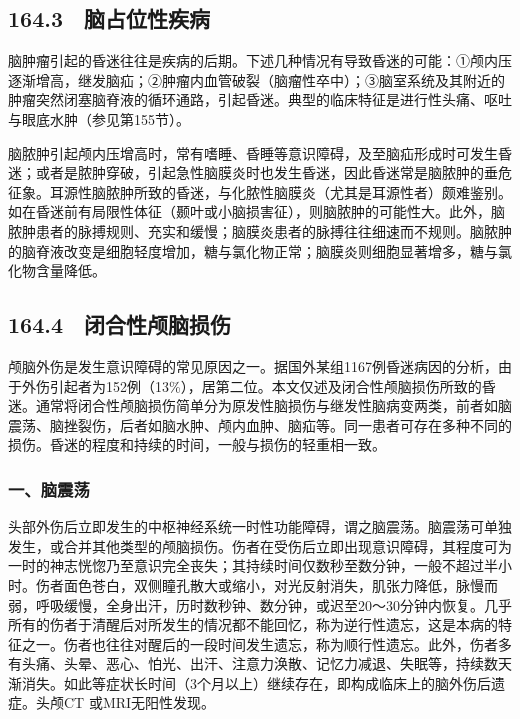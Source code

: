\subsection{164.3　脑占位性疾病}

脑肿瘤引起的昏迷往往是疾病的后期。下述几种情况有导致昏迷的可能：①颅内压逐渐增高，继发脑疝；②肿瘤内血管破裂（脑瘤性卒中）；③脑室系统及其附近的肿瘤突然闭塞脑脊液的循环通路，引起昏迷。典型的临床特征是进行性头痛、呕吐与眼底水肿（参见第155节）。

脑脓肿引起颅内压增高时，常有嗜睡、昏睡等意识障碍，及至脑疝形成时可发生昏迷；或者是脓肿穿破，引起急性脑膜炎时也发生昏迷，因此昏迷常是脑脓肿的垂危征象。耳源性脑脓肿所致的昏迷，与化脓性脑膜炎（尤其是耳源性者）颇难鉴别。如在昏迷前有局限性体征（颞叶或小脑损害征），则脑脓肿的可能性大。此外，脑脓肿患者的脉搏规则、充实和缓慢；脑膜炎患者的脉搏往往细速而不规则。脑脓肿的脑脊液改变是细胞轻度增加，糖与氯化物正常；脑膜炎则细胞显著增多，糖与氯化物含量降低。

\protect\hypertarget{text00378.html}{}{}

\subsection{164.4　闭合性颅脑损伤}

颅脑外伤是发生意识障碍的常见原因之一。据国外某组1167例昏迷病因的分析，由于外伤引起者为152例（13\%），居第二位。本文仅述及闭合性颅脑损伤所致的昏迷。通常将闭合性颅脑损伤简单分为原发性脑损伤与继发性脑病变两类，前者如脑震荡、脑挫裂伤，后者如脑水肿、颅内血肿、脑疝等。同一患者可存在多种不同的损伤。昏迷的程度和持续的时间，一般与损伤的轻重相一致。

\subsubsection{一、脑震荡}

头部外伤后立即发生的中枢神经系统一时性功能障碍，谓之脑震荡。脑震荡可单独发生，或合并其他类型的颅脑损伤。伤者在受伤后立即出现意识障碍，其程度可为一时的神志恍惚乃至意识完全丧失；其持续时间仅数秒至数分钟，一般不超过半小时。伤者面色苍白，双侧瞳孔散大或缩小，对光反射消失，肌张力降低，脉慢而弱，呼吸缓慢，全身出汗，历时数秒钟、数分钟，或迟至20～30分钟内恢复。几乎所有的伤者于清醒后对所发生的情况都不能回忆，称为逆行性遗忘，这是本病的特征之一。伤者也往往对醒后的一段时间发生遗忘，称为顺行性遗忘。此外，伤者多有头痛、头晕、恶心、怕光、出汗、注意力涣散、记忆力减退、失眠等，持续数天渐消失。如此等症状长时间（3个月以上）继续存在，即构成临床上的脑外伤后遗症。头颅CT
或MRI无阳性发现。

